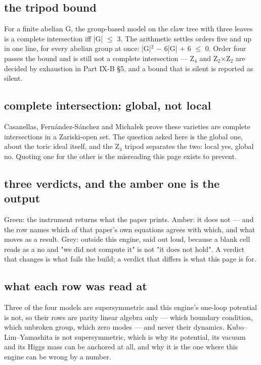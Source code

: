 \documentclass[11pt,a4paper]{article}
\begin{document}
\subsection*{the tripod bound}
For a finite abelian G, the group-based model on the claw tree with three leaves is a complete intersection iff |G| \ensuremath{\leq} 3. The arithmetic settles orders five and up in one line, for every abelian group at once: |G|\ensuremath{{}^{2}} \ensuremath{-} 6|G| + 6 \ensuremath{\leq} 0. Order four passes the bound and is still not a complete intersection --- Z\ensuremath{{}_{4}} and Z\ensuremath{{}_{2}}\ensuremath{\times}Z\ensuremath{{}_{2}} are decided by exhaustion in Part IX-B §5, and a bound that is silent is reported as silent.

\subsection*{complete intersection: global, not local}
Casanellas, Fernández-Sánchez and Micha\l{}ek prove these varieties are complete intersections in a Zariski-open set. The question asked here is the global one, about the toric ideal itself, and the Z\ensuremath{{}_{4}} tripod separates the two: local yes, global no. Quoting one for the other is the misreading this page exists to prevent.

\subsection*{three verdicts, and the amber one is the output}
Green: the instrument returns what the paper prints. Amber: it does not --- and the row names which of that paper's own equations agrees with which, and what moves as a result. Grey: outside this engine, said out loud, because a blank cell reads as a no and "we did not compute it" is not "it does not hold". A verdict that changes is what fails the build; a verdict that differs is what this page is for.

\subsection*{what each row was read at}
Three of the four models are supersymmetric and this engine's one-loop potential is not, so their rows are parity linear algebra only --- which boundary condition, which unbroken group, which zero modes --- and never their dynamics. Kubo--Lim--Yamashita is not supersymmetric, which is why its potential, its vacuum and its Higgs mass can be anchored at all, and why it is the one where this engine can be wrong by a number.
\end{document}
